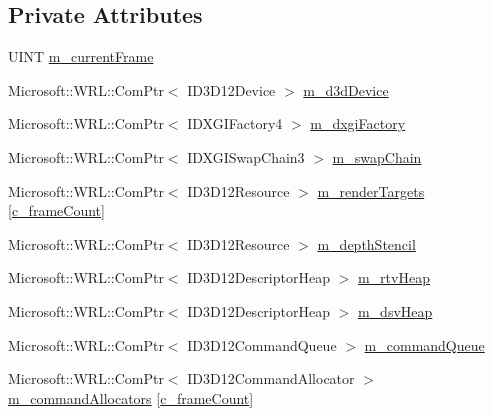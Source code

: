 \subsection*{Private Attributes}
\begin{DoxyCompactItemize}
\item 
U\+I\+NT \mbox{\hyperlink{class_d_x_1_1_device_resources_ac5373e60722eaa25c1068aa754b501fa}{m\+\_\+current\+Frame}}
\item 
Microsoft\+::\+W\+R\+L\+::\+Com\+Ptr$<$ I\+D3\+D12\+Device $>$ \mbox{\hyperlink{class_d_x_1_1_device_resources_ac883ca593d5c03fe20d5865cb033cee1}{m\+\_\+d3d\+Device}}
\item 
Microsoft\+::\+W\+R\+L\+::\+Com\+Ptr$<$ I\+D\+X\+G\+I\+Factory4 $>$ \mbox{\hyperlink{class_d_x_1_1_device_resources_ab644f438ae69bde6c40c147dbda95928}{m\+\_\+dxgi\+Factory}}
\item 
Microsoft\+::\+W\+R\+L\+::\+Com\+Ptr$<$ I\+D\+X\+G\+I\+Swap\+Chain3 $>$ \mbox{\hyperlink{class_d_x_1_1_device_resources_a8f067c81561cd51ac8e59a89e868571b}{m\+\_\+swap\+Chain}}
\item 
Microsoft\+::\+W\+R\+L\+::\+Com\+Ptr$<$ I\+D3\+D12\+Resource $>$ \mbox{\hyperlink{class_d_x_1_1_device_resources_aa96cf4622c1a948b53dfd6f1a08a24cd}{m\+\_\+render\+Targets}} \mbox{[}\mbox{\hyperlink{namespace_d_x_a13eecb6f150dc97fc5c7c8597377d0fb}{c\+\_\+frame\+Count}}\mbox{]}
\item 
Microsoft\+::\+W\+R\+L\+::\+Com\+Ptr$<$ I\+D3\+D12\+Resource $>$ \mbox{\hyperlink{class_d_x_1_1_device_resources_a98406a085f056b96a7c60ad257598fd3}{m\+\_\+depth\+Stencil}}
\item 
Microsoft\+::\+W\+R\+L\+::\+Com\+Ptr$<$ I\+D3\+D12\+Descriptor\+Heap $>$ \mbox{\hyperlink{class_d_x_1_1_device_resources_a23433ca65c8264c961778b97a309ea6a}{m\+\_\+rtv\+Heap}}
\item 
Microsoft\+::\+W\+R\+L\+::\+Com\+Ptr$<$ I\+D3\+D12\+Descriptor\+Heap $>$ \mbox{\hyperlink{class_d_x_1_1_device_resources_a71a459331defc54ff1677609d8608997}{m\+\_\+dsv\+Heap}}
\item 
Microsoft\+::\+W\+R\+L\+::\+Com\+Ptr$<$ I\+D3\+D12\+Command\+Queue $>$ \mbox{\hyperlink{class_d_x_1_1_device_resources_a0f0882523aa09b109f3a7bc05ff01f46}{m\+\_\+command\+Queue}}
\item 
Microsoft\+::\+W\+R\+L\+::\+Com\+Ptr$<$ I\+D3\+D12\+Command\+Allocator $>$ \mbox{\hyperlink{class_d_x_1_1_device_resources_afdaf82b33be14ee78ab6e540f4b63785}{m\+\_\+command\+Allocators}} \mbox{[}\mbox{\hyperlink{namespace_d_x_a13eecb6f150dc97fc5c7c8597377d0fb}{c\+\_\+frame\+Count}}\mbox{]}

\end{DoxyCompactItemize}

